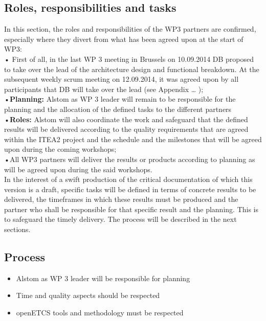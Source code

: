 \documentclass{template/openetcs_report}
\begin{document}
\subsection{Roles, responsibilities and tasks}
In this section, the roles and responsibilities of the WP3 partners are confirmed, especially where they divert from what has been agreed upon at the start of WP3:\\
•	First of all, in the last WP 3 meeting in Brussels on  10.09.2014 DB proposed to take over the lead of the architecture design and functional breakdown. At the subsequent weekly scrum meeting on 12.09.2014,  it was agreed upon by all participants that DB will take over the lead (see Appendix … );\\
•\textbf{Planning:} Alstom as WP 3 leader will remain to be responsible for the planning and the allocation of the defined tasks to the different partners\\
•\textbf{Roles:} Alstom will also coordinate the work and safeguard that the defined results will be delivered according to the quality requirements that are agreed within the ITEA2 project and the schedule and the milestones that will be agreed upon during the coming workshops;\\
•All WP3 partners will deliver the results or products according to planning as will be agreed upon during the said workshops. \\

In the interest of a swift production of the critical documentation of which this version is a draft, specific tasks will be defined in terms of concrete results to be delivered, the timeframes in which these results must be produced and the partner who shall be responsible for that specific result and the planning. This is to safeguard the timely delivery. The process will be described in the next sections.\\

\subsection{Process}
\begin{itemize}
\item Alstom as WP 3 leader will be responsible for planning
\item Time and quality aspects should be respected
\item openETCS tools and methodology must be respected
\end{itemize}
\end{document}
